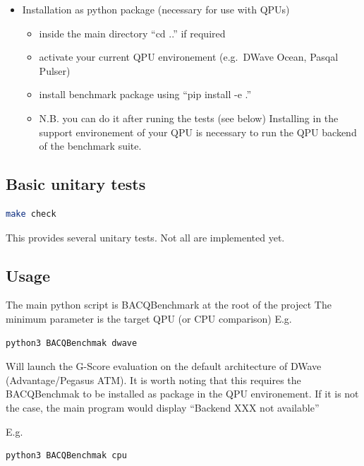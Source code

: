 \begin{itemize}
\tightlist
\item
  Installation as python package (necessary for use with QPUs)

  \begin{itemize}
  \tightlist
  \item
    inside the main directory ``cd ..'' if required
  \item
    activate your current QPU environement (e.g.~DWave Ocean, Pasqal
    Pulser)
  \item
    install benchmark package using ``pip install -e .''
  \item
    N.B. you can do it after runing the tests (see below) Installing in
    the support environement of your QPU is necessary to run the QPU
    backend of the benchmark suite.
  \end{itemize}
\end{itemize}

\subsection{Basic unitary tests}\label{basic-unitary-tests}

\begin{lstlisting}[language=bash]
make check 
\end{lstlisting}

This provides several unitary tests. Not all are implemented yet.

\subsection{Usage}\label{usage}

The main python script is BACQBenchmark at the root of the project The
minimum parameter is the target QPU (or CPU comparison) E.g.

\begin{lstlisting}[language=bash]
python3 BACQBenchmak dwave 
\end{lstlisting}

Will launch the G-Score evaluation on the default architecture of DWave
(Advantage/Pegasus ATM). It is worth noting that this requires the
BACQBenchmak to be installed as package in the QPU environement. If it
is not the case, the main program would display ``Backend XXX not
available''

E.g.

\begin{lstlisting}[language=bash]
python3 BACQBenchmak cpu 
\end{lstlisting}

